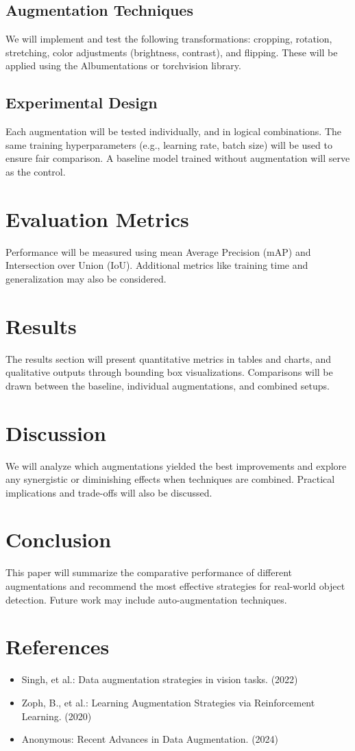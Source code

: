 \documentclass[12pt]{article}
\begin{document}
\subsection{Augmentation Techniques}
We will implement and test the following transformations: cropping, rotation, stretching, color adjustments (brightness, contrast), and flipping. These will be applied using the Albumentations or torchvision library.

\subsection{Experimental Design}
Each augmentation will be tested individually, and in logical combinations. The same training hyperparameters (e.g., learning rate, batch size) will be used to ensure fair comparison. A baseline model trained without augmentation will serve as the control.

\section{Evaluation Metrics}
Performance will be measured using mean Average Precision (mAP) and Intersection over Union (IoU). Additional metrics like training time and generalization may also be considered.

\section{Results}
The results section will present quantitative metrics in tables and charts, and qualitative outputs through bounding box visualizations. Comparisons will be drawn between the baseline, individual augmentations, and combined setups.

\section{Discussion}
We will analyze which augmentations yielded the best improvements and explore any synergistic or diminishing effects when techniques are combined. Practical implications and trade-offs will also be discussed.

\section{Conclusion}
This paper will summarize the comparative performance of different augmentations and recommend the most effective strategies for real-world object detection. Future work may include auto-augmentation techniques.

\section*{References}
\vspace{-0.5em}
\begin{itemize}
  \item Singh, et al.: Data augmentation strategies in vision tasks. (2022)
  \item Zoph, B., et al.: Learning Augmentation Strategies via Reinforcement Learning. (2020)
  \item Anonymous: Recent Advances in Data Augmentation. (2024)
\end{itemize}
\end{document}
